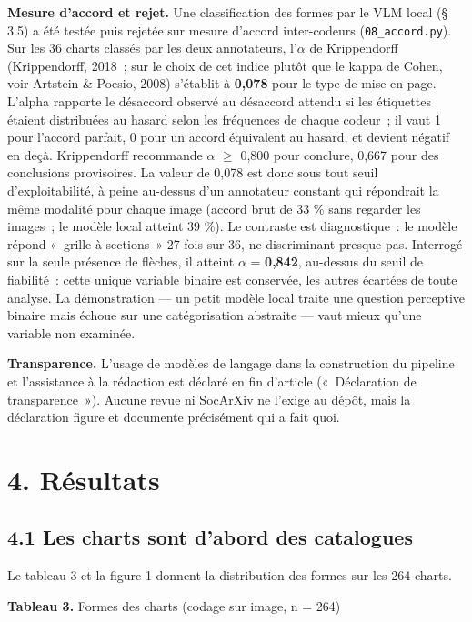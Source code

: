 \documentclass[11pt,a4paper]{article}
\begin{document}
\textbf{Mesure d'accord et rejet.} Une classification des formes par le VLM local (§ 3.5) a été testée puis rejetée sur mesure d'accord inter-codeurs (\texttt{08\_accord.py}). Sur les 36 charts classés par les deux annotateurs, l'$\alpha$ de Krippendorff (Krippendorff, 2018~; sur le choix de cet indice plutôt que le kappa de Cohen, voir Artstein \& Poesio, 2008) s'établit à \textbf{0,078} pour le type de mise en page. L'alpha rapporte le désaccord observé au désaccord attendu si les étiquettes étaient distribuées au hasard selon les fréquences de chaque codeur~; il vaut 1 pour l'accord parfait, 0 pour un accord équivalent au hasard, et devient négatif en deçà. Krippendorff recommande $\alpha$ $\geq$ 0,800 pour conclure, 0,667 pour des conclusions provisoires. La valeur de 0,078 est donc sous tout seuil d'exploitabilité, à peine au-dessus d'un annotateur constant qui répondrait la même modalité pour chaque image (accord brut de 33 \% sans regarder les images~; le modèle local atteint 39 \%). Le contraste est diagnostique~: le modèle répond «~grille à sections~» 27 fois sur 36, ne discriminant presque pas. Interrogé sur la seule présence de flèches, il atteint $\alpha$ = \textbf{0,842}, au-dessus du seuil de fiabilité~: cette unique variable binaire est conservée, les autres écartées de toute analyse. La démonstration --- un petit modèle local traite une question perceptive binaire mais échoue sur une catégorisation abstraite --- vaut mieux qu'une variable non examinée.

\textbf{Transparence.} L'usage de modèles de langage dans la construction du pipeline et l'assistance à la rédaction est déclaré en fin d'article («~Déclaration de transparence~»). Aucune revue ni SocArXiv ne l'exige au dépôt, mais la déclaration figure et documente précisément qui a fait quoi.

\section*{4. Résultats}

\subsection*{4.1 Les charts sont d'abord des catalogues}

Le tableau 3 et la figure 1 donnent la distribution des formes sur les 264 charts.

\noindent \textbf{Tableau 3.} Formes des charts (codage sur image, n = 264)\\[-0.2em]
\end{document}

